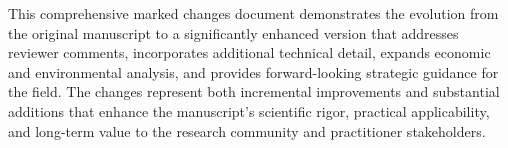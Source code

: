 \documentclass[12pt,a4paper]{article}
\begin{document}
This comprehensive marked changes document demonstrates the evolution from the original manuscript to a significantly enhanced version that addresses reviewer comments, incorporates additional technical detail, expands economic and environmental analysis, and provides forward-looking strategic guidance for the field. The changes represent both incremental improvements and substantial additions that enhance the manuscript's scientific rigor, practical applicability, and long-term value to the research community and practitioner stakeholders.
\end{document}
